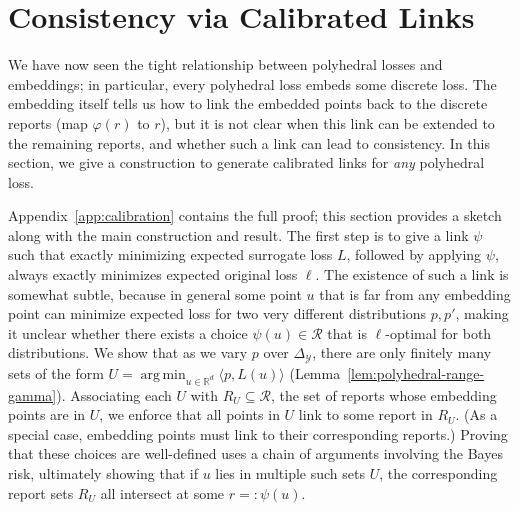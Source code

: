 \documentclass[12pt]{article}
\newcommand{\Comments}{1}
\newcommand{\mynote}[2]{\ifnum\Comments=1\textcolor{#1}{#2}\fi}
\newcommand{\bo}[1]{\mynote{blue}{[Bo: #1]}}
\newcommand{\reals}{\mathbb{R}}
\newcommand{\simplex}{\Delta_\Y}
\newcommand{\R}{\mathcal{R}}
\newcommand{\Y}{\mathcal{Y}}
\newcommand{\inprod}[2]{\langle #1, #2 \rangle}%
\newcommand{\toto}{\rightrightarrows}
\newcommand{\trim}{\mathrm{trim}}
\DeclareMathOperator*{\argmin}{arg\,min}
\newtheorem{proposition}{Proposition}
\begin{document}
\section{Consistency via Calibrated Links}
\label{sec:calibration}

We have now seen the tight relationship between polyhedral losses and embeddings; in particular, every polyhedral loss embeds some discrete loss.
The embedding itself tells us how to link the embedded points back to the discrete reports (map $\varphi(r)$ to $r$), but it is not clear when this link can be extended to the remaining reports, and whether such a link can lead to consistency.
In this section, we give a construction to generate calibrated links for \emph{any} polyhedral loss.

Appendix~\ref{app:calibration} contains the full proof; this section provides a sketch along with the main construction and result.
The first step is to give a link $\psi$ such that exactly minimizing expected surrogate loss $L$, followed by applying $\psi$, always exactly minimizes expected original loss $\ell$.
The existence of such a link is somewhat subtle, because in general some point $u$ that is far from any embedding point can minimize expected loss for two very different distributions $p,p'$, making it unclear whether there exists a choice $\psi(u)\in\R$ that is $\ell$-optimal for both distributions.
We show that as we vary $p$ over $\simplex$, there are only finitely many sets of the form $U = \argmin_{u \in \reals^d} \inprod{p}{L(u)}$ (Lemma~\ref{lem:polyhedral-range-gamma}).
Associating each $U$ with $R_U \subseteq \R$, the set of reports whose embedding points are in $U$, we enforce that all points in $U$ link to some report in $R_U$.
(As a special case, embedding points must link to their corresponding reports.)
Proving that these choices are well-defined uses a chain of arguments involving the Bayes risk, ultimately showing that if $u$ lies in multiple such sets $U$, the corresponding report sets $R_U$ all intersect at some $r =: \psi(u)$.

%
\end{document}
